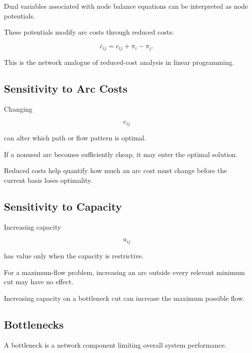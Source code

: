 Dual variables associated with node balance equations can be interpreted
as node potentials.

These potentials modify arc costs through reduced costs:

\[
\boxed{
\bar c_{ij}
=
c_{ij}
+
\pi_i
-
\pi_j.
}
\]

This is the network analogue of reduced-cost analysis in linear
programming.

\subsection{Sensitivity to Arc Costs}
\label{subsec:network-cost-sensitivity}

Changing

\[
c_{ij}
\]

can alter which path or flow pattern is optimal.

If a nonused arc becomes sufficiently cheap, it may enter the optimal
solution.

Reduced costs help quantify how much an arc cost must change before the
current basis loses optimality.

\subsection{Sensitivity to Capacity}
\label{subsec:network-capacity-sensitivity}

Increasing capacity

\[
u_{ij}
\]

has value only when the capacity is restrictive.

For a maximum-flow problem, increasing an arc outside every relevant
minimum cut may have no effect.

Increasing capacity on a bottleneck cut can increase the maximum possible
flow.

\subsection{Bottlenecks}
\label{subsec:network-bottlenecks}

A bottleneck is a network component limiting overall system performance.

